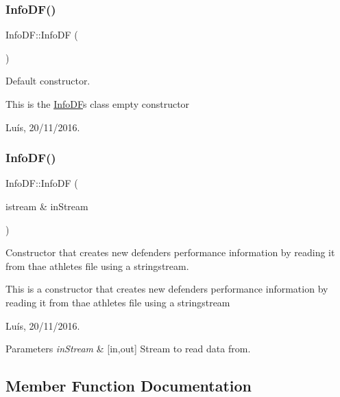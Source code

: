 \subsubsection{\texorpdfstring{Info\+D\+F()}{InfoDF()}\hspace{0.1cm}{\footnotesize\ttfamily [3/4]}}
{\footnotesize\ttfamily Info\+D\+F\+::\+Info\+DF (\begin{DoxyParamCaption}{ }\end{DoxyParamCaption})}



Default constructor. 

This is the \hyperlink{class_info_d_f}{Info\+DF}\textquotesingle{}s class empty constructor

Luís, 20/11/2016. \hypertarget{class_info_d_f_a54560987e55966335300ba6a3034c926}{}\label{class_info_d_f_a54560987e55966335300ba6a3034c926} 
\subsubsection{\texorpdfstring{Info\+D\+F()}{InfoDF()}\hspace{0.1cm}{\footnotesize\ttfamily [4/4]}}
{\footnotesize\ttfamily Info\+D\+F\+::\+Info\+DF (\begin{DoxyParamCaption}\item[{istream \&}]{in\+Stream }\end{DoxyParamCaption})}



Constructor that creates new defender\textquotesingle{}s performance information by reading it from thae athletes file using a stringstream. 

This is a constructor that creates new defender\textquotesingle{}s performance information by reading it from thae athletes file using a stringstream

Luís, 20/11/2016. 


\begin{DoxyParams}{Parameters}
{\em in\+Stream} & \mbox{[}in,out\mbox{]} Stream to read data from. \\
\hline
\end{DoxyParams}


\subsection{Member Function Documentation}
\hypertarget{class_info_d_f_aaa161b2c4a56878d3c691ec4de3129c3}{}\label{class_info_d_f_aaa161b2c4a56878d3c691ec4de3129c3} 
